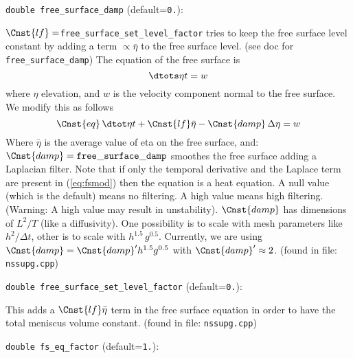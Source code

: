 \item\verb+double free_surface_damp+ {\rm(default=\verb|0.|)}:

$\Cnst{lf}=${\tt free\_surface\_set\_level\_factor} tries to
keep the free surface level constant by adding a term $\propto
\bar\eta$ to the free surface level.  (see doc for {\tt
free\_surface\_damp})
\label{sec:free_surface}
The equation of the free surface is
%
\begin{equation} 
\dtots\eta t = w
\end{equation}
%
where $\eta$ 
elevation, and $w$ is the velocity component normal to the free
surface. We modify this as follows 
%
\begin{equation} \label{eq:fsmod}  
\Cnst{eq}\,\dtot\eta t 
   + \Cnst{lf} \bar{\eta} - \Cnst{damp} \, \Delta \eta = w
\end{equation}
%
Where $\bar\eta$ is the average value of eta on the free surface, and:
$\Cnst{damp}={\tt free\_surface\_damp}$ smoothes the free surface
adding a Laplacian filter.  Note that if only the temporal derivative
and the Laplace term are present in (\ref{eq:fsmod}) then the equation
is a heat equation. A null value (which is the default) means no
filtering. A high value means high filtering. (Warning: A high value
may result in unstability).  $\Cnst{damp}$ has dimensions of $L^2/T$
(like a diffusivity). One possibility is to scale with mesh parameters
like $h^2/\Delta t$, other is to scale with $h^{1.5} \,
g^{0.5}$. Currently, we are using $\Cnst{damp} = \Cnst{damp}' h^{1.5}
g^{0.5}$ with $\Cnst{damp}'\approx 2$.
 (found in file: \verb+nssupg.cpp+)
\item\verb+double free_surface_set_level_factor+ {\rm(default=\verb|0.|)}:

This adds a $\Cnst{lf}\bar\eta$ term in the free surface equation
in order to have the total meniscus volume constant. 
 (found in file: \verb+nssupg.cpp+)
\item\verb+double fs_eq_factor+ {\rm(default=\verb|1.|)}:

